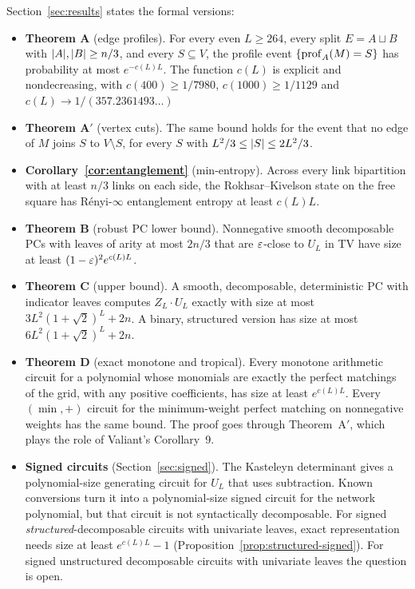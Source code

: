 Section~\ref{sec:results} states the formal versions:
\begin{itemize}
\item \textbf{Theorem A} (edge profiles). For every even $L\ge264$, every split $E=A\sqcup B$ with $\lvert A\rvert,\lvert B\rvert\ge n/3$, and every $S\subseteq V$, the profile event $\{\operatorname{prof}_A(M)=S\}$ has probability at most $e^{-c(L)L}$. The function $c(L)$ is explicit and nondecreasing, with $c(400)\ge1/7980$, $c(1000)\ge1/1129$ and $c(L)\to1/(357.2361493\ldots)$
\item \textbf{Theorem A$'$} (vertex cuts). The same bound holds for the event that no edge of $M$ joins $S$ to $V\setminus S$, for every $S$ with $L^2/3\le\lvert S\rvert\le 2L^2/3$.
\item \textbf{Corollary~\ref{cor:entanglement}} (min-entropy). Across every link bipartition with at least $n/3$ links on each side, the Rokhsar--Kivelson state on the free square has R\'enyi-$\infty$ entanglement entropy at least $c(L)L$.
\item \textbf{Theorem B} (robust PC lower bound). Nonnegative smooth decomposable PCs with leaves of arity at most $2n/3$ that are $\varepsilon$-close to $U_L$ in TV have size at least $(1-\varepsilon)^2e^{c(L)L}$.
\item \textbf{Theorem C} (upper bound). A smooth, decomposable, deterministic PC with indicator leaves computes $Z_L\cdot U_L$ exactly with size at most $3L^2(1+\sqrt2)^L+2n$. A binary, structured version has size at most $6L^2(1+\sqrt2)^L+2n$.
\item \textbf{Theorem D} (exact monotone and tropical). Every monotone arithmetic circuit for a polynomial whose monomials are exactly the perfect matchings of the grid, with any positive coefficients, has size at least $e^{c(L)L}$. Every $(\min,+)$ circuit for the minimum-weight perfect matching on nonnegative weights has the same bound. The proof goes through Theorem~A$'$, which plays the role of Valiant's Corollary~9.
\item \textbf{Signed circuits} (Section~\ref{sec:signed}). The Kasteleyn determinant gives a polynomial-size generating circuit for $U_L$ that uses subtraction. Known conversions \cite{AgarwalBlaser24,BroadrickZhangVdB24} turn it into a polynomial-size signed circuit for the network polynomial, but that circuit is not syntactically decomposable. For signed \emph{structured}-decomposable circuits with univariate leaves, exact representation needs size at least $e^{c(L)L}-1$ (Proposition~\ref{prop:structured-signed}). For signed unstructured decomposable circuits with univariate leaves the question is open.
\end{itemize}


